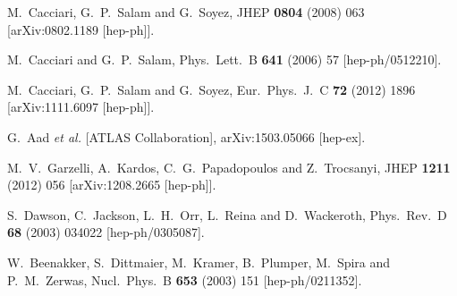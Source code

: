 \documentclass[preprintnumbers,superscriptaddress,nofootinbib,aps,prd,floatfix]{revtex4}
\begin{document}
\begin{thebibliography}{99}
  M.~Cacciari, G.~P.~Salam and G.~Soyez,
  JHEP {\bf 0804} (2008) 063
  [arXiv:0802.1189 [hep-ph]].
  
  M.~Cacciari and G.~P.~Salam,
  Phys.\ Lett.\ B {\bf 641} (2006) 57
  [hep-ph/0512210].
  
  M.~Cacciari, G.~P.~Salam and G.~Soyez,
  Eur.\ Phys.\ J.\ C {\bf 72} (2012) 1896
  [arXiv:1111.6097 [hep-ph]].
       
  G.~Aad {\it et al.} [ATLAS Collaboration],
  arXiv:1503.05066 [hep-ex].

  M.~V.~Garzelli, A.~Kardos, C.~G.~Papadopoulos and Z.~Trocsanyi,
  JHEP {\bf 1211} (2012) 056
  [arXiv:1208.2665 [hep-ph]].
  
  S.~Dawson, C.~Jackson, L.~H.~Orr, L.~Reina and D.~Wackeroth,
  Phys.\ Rev.\ D {\bf 68} (2003) 034022
  [hep-ph/0305087].
  
  W.~Beenakker, S.~Dittmaier, M.~Kramer, B.~Plumper, M.~Spira and P.~M.~Zerwas,
  Nucl.\ Phys.\ B {\bf 653} (2003) 151
  [hep-ph/0211352].
  

\end{thebibliography}
\end{document}
